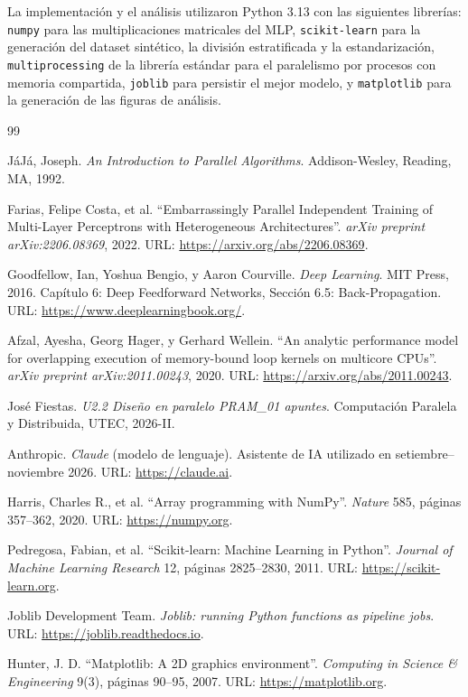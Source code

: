 \documentclass[11pt, a4paper]{article}
\begin{document}
La implementación y el análisis utilizaron Python 3.13 con las siguientes librerías: \texttt{numpy} \cite{numpy} para las multiplicaciones matricales del MLP, \texttt{scikit-learn} \cite{sclearn} para la generación del dataset sint\'etico, la divisi\'on estratificada y la estandarizaci\'on, \texttt{multiprocessing} de la librer\'ia est\'andar para el paralelismo por procesos con memoria compartida, \texttt{joblib} \cite{joblib} para persistir el mejor modelo, y \texttt{matplotlib} \cite{matplotlib} para la generaci\'on de las figuras de an\'alisis.

\begin{thebibliography}{99}

JáJá, Joseph.
\textit{An Introduction to Parallel Algorithms}.
Addison-Wesley, Reading, MA, 1992.

Farias, Felipe Costa, et al.
``Embarrassingly Parallel Independent Training of Multi-Layer Perceptrons with Heterogeneous Architectures''.
\textit{arXiv preprint arXiv:2206.08369}, 2022.
URL: \url{https://arxiv.org/abs/2206.08369}.

Goodfellow, Ian, Yoshua Bengio, y Aaron Courville.
\textit{Deep Learning}.
MIT Press, 2016. Capítulo 6: Deep Feedforward Networks, Sección 6.5: Back-Propagation.
URL: \url{https://www.deeplearningbook.org/}.

Afzal, Ayesha, Georg Hager, y Gerhard Wellein.
``An analytic performance model for overlapping execution of memory-bound loop kernels on multicore CPUs''.
\textit{arXiv preprint arXiv:2011.00243}, 2020.
URL: \url{https://arxiv.org/abs/2011.00243}.

José Fiestas.
\textit{U2.2 Diseño en paralelo PRAM\_01 apuntes}.
Computación Paralela y Distribuida, UTEC, 2026-II.

Anthropic.
\textit{Claude} (modelo de lenguaje). Asistente de IA utilizado en setiembre--noviembre 2026.
URL: \url{https://claude.ai}.

Harris, Charles R., et al.
``Array programming with NumPy''.
\textit{Nature} 585, p\'aginas 357--362, 2020.
URL: \url{https://numpy.org}.

Pedregosa, Fabian, et al.
``Scikit-learn: Machine Learning in Python''.
\textit{Journal of Machine Learning Research} 12, p\'aginas 2825--2830, 2011.
URL: \url{https://scikit-learn.org}.

Joblib Development Team.
\textit{Joblib: running Python functions as pipeline jobs}.
URL: \url{https://joblib.readthedocs.io}.

Hunter, J. D.
``Matplotlib: A 2D graphics environment''.
\textit{Computing in Science \& Engineering} 9(3), p\'aginas 90--95, 2007.
URL: \url{https://matplotlib.org}.

\end{thebibliography}
\end{document}
